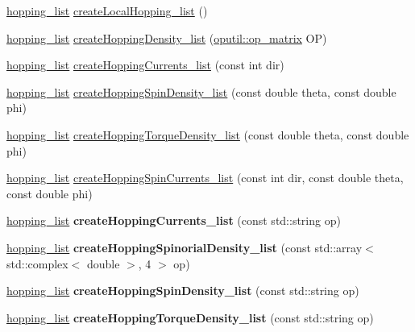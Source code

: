 \begin{DoxyCompactItemize}
\item 
\hyperlink{classhopping__list}{hopping\+\_\+list} \hyperlink{classtbmodel_aec77e33a90b894377def9814c91ca49d}{create\+Local\+Hopping\+\_\+list} ()
\item 
\hyperlink{classhopping__list}{hopping\+\_\+list} \hyperlink{classtbmodel_aec3324656e65583ec29f935757b4bc2e}{create\+Hopping\+Density\+\_\+list} (\hyperlink{structoputil_1_1op__matrix}{oputil\+::op\+\_\+matrix} OP)
\item 
\hyperlink{classhopping__list}{hopping\+\_\+list} \hyperlink{classtbmodel_a77324c81674f2c43e6214ca8313ced79}{create\+Hopping\+Currents\+\_\+list} (const int dir)
\item 
\hyperlink{classhopping__list}{hopping\+\_\+list} \hyperlink{classtbmodel_aae40bea134fc6d634cc82a0bf2cb0a5d}{create\+Hopping\+Spin\+Density\+\_\+list} (const double theta, const double phi)
\item 
\hyperlink{classhopping__list}{hopping\+\_\+list} \hyperlink{classtbmodel_ab9766c523ec0221ac91ccd507ed8f992}{create\+Hopping\+Torque\+Density\+\_\+list} (const double theta, const double phi)
\item 
\hyperlink{classhopping__list}{hopping\+\_\+list} \hyperlink{classtbmodel_a31f942be44b0a1af276ba413276d046e}{create\+Hopping\+Spin\+Currents\+\_\+list} (const int dir, const double theta, const double phi)
\item 
\hyperlink{classhopping__list}{hopping\+\_\+list} {\bfseries create\+Hopping\+Currents\+\_\+list} (const std\+::string op)\hypertarget{classtbmodel_a497b3607c1d498285d68ff08ac2f315b}{}\label{classtbmodel_a497b3607c1d498285d68ff08ac2f315b}

\item 
\hyperlink{classhopping__list}{hopping\+\_\+list} {\bfseries create\+Hopping\+Spinorial\+Density\+\_\+list} (const std\+::array$<$ std\+::complex$<$ double $>$, 4 $>$ op)\hypertarget{classtbmodel_abd021ce1ebe29c77197857eda7641dac}{}\label{classtbmodel_abd021ce1ebe29c77197857eda7641dac}

\item 
\hyperlink{classhopping__list}{hopping\+\_\+list} {\bfseries create\+Hopping\+Spin\+Density\+\_\+list} (const std\+::string op)\hypertarget{classtbmodel_aaf0f711704f7dcfc6f186c97ec024f63}{}\label{classtbmodel_aaf0f711704f7dcfc6f186c97ec024f63}

\item 
\hyperlink{classhopping__list}{hopping\+\_\+list} {\bfseries create\+Hopping\+Torque\+Density\+\_\+list} (const std\+::string op)\hypertarget{classtbmodel_acac9ec7ef9b8e684372e09b14b73aa59}{}\label{classtbmodel_acac9ec7ef9b8e684372e09b14b73aa59}


\end{DoxyCompactItemize}
